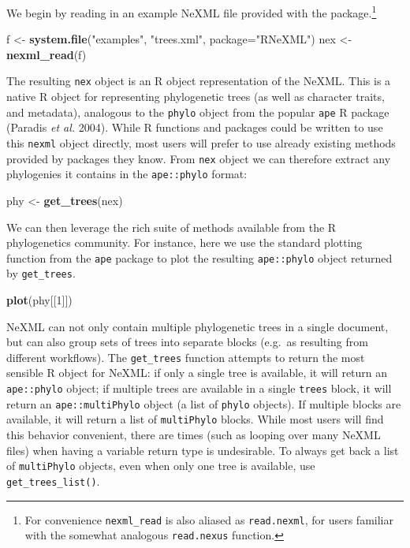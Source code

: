 \documentclass[author-year, review, 11pt]{components/elsarticle} %
\newenvironment{Shaded}{\begin{snugshade}}{\end{snugshade}}
\newcommand{\KeywordTok}[1]{\textcolor[rgb]{0.13,0.29,0.53}{\textbf{{#1}}}}
\newcommand{\DataTypeTok}[1]{\textcolor[rgb]{0.13,0.29,0.53}{{#1}}}
\newcommand{\DecValTok}[1]{\textcolor[rgb]{0.00,0.00,0.81}{{#1}}}
\newcommand{\StringTok}[1]{\textcolor[rgb]{0.31,0.60,0.02}{{#1}}}
\newcommand{\NormalTok}[1]{{#1}}
\begin{document}
We begin by reading in an example NeXML file provided with the
package.\footnote{For convenience \texttt{nexml\_read} is also aliased
  as \texttt{read.nexml}, for users familiar with the somewhat analogous
  \texttt{read.nexus} function.}

\begin{Shaded}
\begin{Highlighting}[]
\NormalTok{f <-}\StringTok{ }\KeywordTok{system.file}\NormalTok{(}\StringTok{"examples"}\NormalTok{, }\StringTok{"trees.xml"}\NormalTok{, }\DataTypeTok{package=}\StringTok{"RNeXML"}\NormalTok{)}
\NormalTok{nex <-}\StringTok{ }\KeywordTok{nexml_read}\NormalTok{(f)}
\end{Highlighting}
\end{Shaded}

The resulting \texttt{nex} object is an R object representation of the
NeXML. This is a native R object for representing phylogenetic trees (as
well as character traits, and metadata), analogous to the \texttt{phylo}
object from the popular \texttt{ape} R package (Paradis \emph{et al.}
2004). While R functions and packages could be written to use this
\texttt{nexml} object directly, most users will prefer to use already
existing methods provided by packages they know. From \texttt{nex}
object we can therefore extract any phylogenies it contains in the
\texttt{ape::phylo} format:

\begin{Shaded}
\begin{Highlighting}[]
\NormalTok{phy <-}\StringTok{ }\KeywordTok{get_trees}\NormalTok{(nex)}
\end{Highlighting}
\end{Shaded}

We can then leverage the rich suite of methods available from the R
phylogenetics community. For instance, here we use the standard plotting
function from the \texttt{ape} package to plot the resulting
\texttt{ape::phylo} object returned by \texttt{get\_trees}.

\begin{Shaded}
\begin{Highlighting}[]
\KeywordTok{plot}\NormalTok{(phy[[}\DecValTok{1}\NormalTok{]])}
\end{Highlighting}
\end{Shaded}

NeXML can not only contain multiple phylogenetic trees in a single
document, but can also group sets of trees into separate blocks (e.g.~as
resulting from different workflows). The \texttt{get\_trees} function
attempts to return the most sensible R object for NeXML: if only a
single tree is available, it will return an \texttt{ape::phylo} object;
if multiple trees are available in a single \texttt{trees} block, it
will return an \texttt{ape::multiPhylo} object (a list of \texttt{phylo}
objects). If multiple blocks are available, it will return a list of
\texttt{multiPhylo} blocks. While most users will find this behavior
convenient, there are times (such as looping over many NeXML files) when
having a variable return type is undesirable. To always get back a list
of \texttt{multiPhylo} objects, even when only one tree is available,
use \texttt{get\_trees\_list()}.
\end{document}
